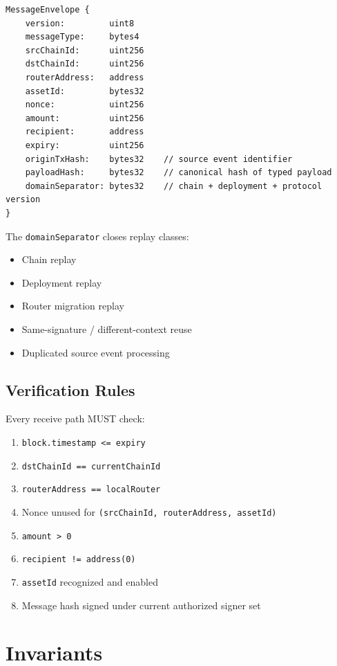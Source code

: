 \documentclass[11pt,a4paper]{article}
\begin{document}
\begin{verbatim}
MessageEnvelope {
    version:         uint8
    messageType:     bytes4
    srcChainId:      uint256
    dstChainId:      uint256
    routerAddress:   address
    assetId:         bytes32
    nonce:           uint256
    amount:          uint256
    recipient:       address
    expiry:          uint256
    originTxHash:    bytes32    // source event identifier
    payloadHash:     bytes32    // canonical hash of typed payload
    domainSeparator: bytes32    // chain + deployment + protocol version
}
\end{verbatim}

The \texttt{domainSeparator} closes replay classes:
\begin{itemize}[leftmargin=2em]
\item Chain replay
\item Deployment replay
\item Router migration replay
\item Same-signature / different-context reuse
\item Duplicated source event processing
\end{itemize}

\subsection{Verification Rules}

Every receive path MUST check:

\begin{enumerate}[leftmargin=2em]
\item \texttt{block.timestamp <= expiry}
\item \texttt{dstChainId == currentChainId}
\item \texttt{routerAddress == localRouter}
\item Nonce unused for \texttt{(srcChainId, routerAddress, assetId)}
\item \texttt{amount > 0}
\item \texttt{recipient != address(0)}
\item \texttt{assetId} recognized and enabled
\item Message hash signed under current authorized signer set
\end{enumerate}

\section{Invariants}
\end{document}
